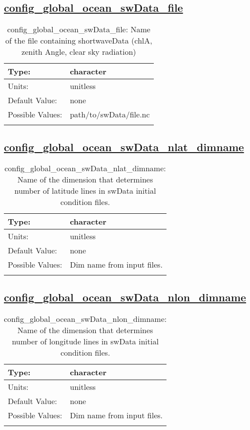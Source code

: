 \subsection[config\_global\_ocean\_swData\_file]{\hyperref[sec:nm_tab_global_ocean]{config\_global\_ocean\_swData\_file}}
\label{subsec:nm_sec_config_global_ocean_swData_file}
\begin{center}
\begin{longtable}{| p{2.0in} || p{4.0in} |}
    \hline
    Type: & character \\
    \hline
    Units: & \si{unitless} \\
    \hline
    Default Value: & none \\
    \hline
    Possible Values: & path/to/swData/file.nc \\
    \hline
    \caption{config\_global\_ocean\_swData\_file: Name of the file containing shortwaveData (chlA, zenith Angle, clear sky radiation)}
\end{longtable}
\end{center}
\subsection[config\_global\_ocean\_swData\_nlat\_dimname]{\hyperref[sec:nm_tab_global_ocean]{config\_global\_ocean\_swData\_nlat\_dimname}}
\label{subsec:nm_sec_config_global_ocean_swData_nlat_dimname}
\begin{center}
\begin{longtable}{| p{2.0in} || p{4.0in} |}
    \hline
    Type: & character \\
    \hline
    Units: & \si{unitless} \\
    \hline
    Default Value: & none \\
    \hline
    Possible Values: & Dim name from input files. \\
    \hline
    \caption{config\_global\_ocean\_swData\_nlat\_dimname: Name of the dimension that determines number of latitude lines in swData initial condition files.}
\end{longtable}
\end{center}
\subsection[config\_global\_ocean\_swData\_nlon\_dimname]{\hyperref[sec:nm_tab_global_ocean]{config\_global\_ocean\_swData\_nlon\_dimname}}
\label{subsec:nm_sec_config_global_ocean_swData_nlon_dimname}
\begin{center}
\begin{longtable}{| p{2.0in} || p{4.0in} |}
    \hline
    Type: & character \\
    \hline
    Units: & \si{unitless} \\
    \hline
    Default Value: & none \\
    \hline
    Possible Values: & Dim name from input files. \\
    \hline
    \caption{config\_global\_ocean\_swData\_nlon\_dimname: Name of the dimension that determines number of longitude lines in swData initial condition files.}
\end{longtable}
\end{center}
